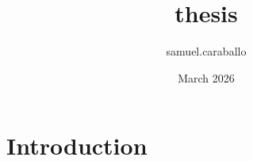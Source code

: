 \documentclass{article}
\title{thesis}
\author{samuel.caraballo }
\date{March 2026}
\begin{document}
\maketitle

\section{Introduction}
\end{document}
